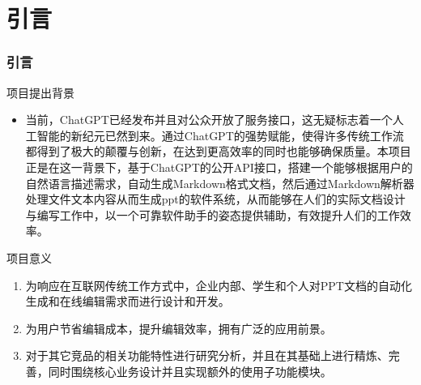 %
%
%
%
\section{引言}
    \begin{frame}
    \frametitle{引言}
        \footnotesize
        \begin{block}{项目提出背景}
            \begin{itemize}
                \item 	当前，ChatGPT已经发布并且对公众开放了服务接口，这无疑标志着一个人工智能的新纪元已然到来。通过ChatGPT的强势赋能，使得许多传统工作流都得到了极大的颠覆与创新，在达到更高效率的同时也能够确保质量。本项目正是在这一背景下，基于ChatGPT的公开API接口，搭建一个能够根据用户的自然语言描述需求，自动生成Markdown格式文档，然后通过Markdown解析器处理文件文本内容从而生成ppt的软件系统，从而能够在人们的实际文档设计与编写工作中，以一个可靠软件助手的姿态提供辅助，有效提升人们的工作效率。
            \end{itemize}
        \end{block}

        \begin{block}{项目意义}
            \begin{enumerate}
                \item 为响应在互联网传统工作方式中，企业内部、学生和个人对PPT文档的自动化生成和在线编辑需求而进行设计和开发。
                \item 为用户节省编辑成本，提升编辑效率，拥有广泛的应用前景。
                \item 对于其它竞品的相关功能特性进行研究分析，并且在其基础上进行精炼、完善，同时围绕核心业务设计并且实现额外的使用子功能模块。
            \end{enumerate}
        \end{block}
    \end{frame}

